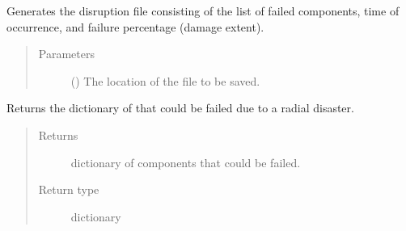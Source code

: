 \documentclass[letterpaper,10pt,english]{sphinxmanual}
\begin{document}
\begin{fulllineitems}

\begin{fulllineitems}
\label{\detokenize{apidoc:dreaminsg_integrated_model.src.hazard_initiator.RadialDisruption.generate_disruption_file}}
\sphinxAtStartPar
Generates the disruption file consisting of the list of failed components, time of occurrence, and failure percentage (damage extent).
\begin{quote}\begin{description}
\item[{Parameters}] \leavevmode
\sphinxAtStartPar
{} () \textendash{} The location of the file to be saved.

\end{description}\end{quote}

\end{fulllineitems}


\begin{fulllineitems}
\label{\detokenize{apidoc:dreaminsg_integrated_model.src.hazard_initiator.RadialDisruption.get_fail_compon_dict}}
\sphinxAtStartPar
Returns the dictionary of that could be failed due to a radial disaster.
\begin{quote}\begin{description}
\item[{Returns}] \leavevmode
\sphinxAtStartPar
dictionary of components that could be failed.

\item[{Return type}] \leavevmode
\sphinxAtStartPar
dictionary

\end{description}\end{quote}

\end{fulllineitems}



\end{fulllineitems}
\end{document}
